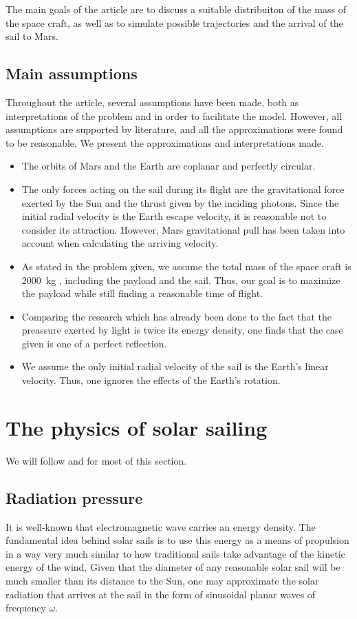 \documentclass[twocolumn,12pt,a4paper]{article}
\numberwithin{equation}{section}
\begin{document}
The main goals of the article are to discuss a suitable distribuiton of the mass of the space craft, as well as to simulate possible trajectories and the arrival of the sail to Mars.

\subsection{Main assumptions}
Throughout the article, several assumptions have been made, both as interpretations of the problem and in order to facilitate the model. However, all assumptions are supported by literature, and all the approximations were found to be reasonable. We present the approximations and interpretations made.

\begin{itemize}
\item The orbits of Mars and the Earth are coplanar and perfectly circular.
\item The only forces acting on the sail during its flight are the gravitational force exerted by the Sun and the thrust given by the inciding photons. Since the initial radial velocity is the Earth escape velocity, it is reasonable not to consider its attraction. However, Mars gravitational pull has been taken into account when calculating the arriving velocity.
\item As stated in the problem given, we assume the total mass of the space craft is \SI{2 000}{kg} , including the payload and the sail. Thus, our goal is to maximize the payload while still finding a reasonable time of flight. 
\item Comparing the research which has already been done to the fact that the preassure exerted by light is twice its energy density, one finds that the case given is one of a perfect reflection.
\item We assume the only initial radial velocity of the sail is the Earth's linear velocity. Thus, one ignores the effects of the Earth's rotation.
\end{itemize}


\section{The physics of solar sailing}
We will follow \cite{tsu} and \cite{mcinnes} for most of this section.
\subsection{Radiation pressure}
It is well-known that electromagnetic wave carries an energy density. The fundamental idea behind solar sails is to use this energy as a means of propulsion in a way very much similar to how traditional sails take advantage of the kinetic energy of the wind. Given that the diameter of any reasonable solar sail will be much smaller than its distance to the Sun, one may approximate the solar radiation that arrives at the sail in the form of sinusoidal planar waves of frequency \( \omega \).
\end{document}
